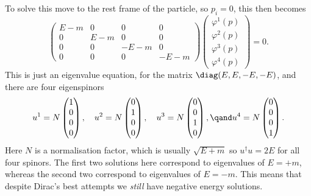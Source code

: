 \documentclass[fleqn]{NotesClass}
\newcommand{\hermit}{\dagger}
\begin{document}
    To solve this move to the rest frame of the particle, so \(p_i = 0\), this then becomes
    \begin{equation}
        \begin{pmatrix}
            E - m & 0 & 0 & 0\\
            0 & E - m & 0 & 0\\
            0 & 0 & -E - m & 0\\
            0 & 0 & 0 & -E - m
        \end{pmatrix}	
        \begin{pmatrix}
            \varphi^1(p)\\ \varphi^2(p)\\ \varphi^3(p)\\ \varphi^4(p)
        \end{pmatrix}
        = 0.
    \end{equation}
    This is just an eigenvalue equation, for the matrix \(\diag(E, E, -E, -E)\), and there are four eigenspinors
    \begin{equation}
        u^1 = N
        \begin{pmatrix}
            1\\ 0\\ 0\\ 0
        \end{pmatrix}
        , \quad u^2 = N
        \begin{pmatrix}
            0\\ 1\\ 0\\ 0
        \end{pmatrix}
        , \quad u^3 = N
        \begin{pmatrix}
            0\\ 0\\ 1\\ 0
        \end{pmatrix}
        , \qand u^4 = N
        \begin{pmatrix}
            0\\ 0\\ 0\\ 1
        \end{pmatrix}
        .
    \end{equation}
    Here \(N\) is a normalisation factor, which is usually \(\sqrt{E + m}\) so \(u^\hermit u = 2E\) for all four spinors.
    The first two solutions here correspond to eigenvalues of \(E = +m\), whereas the second two correspond to eigenvalues of \(E = -m\).
    This means that despite Dirac's best attempts we \emph{still} have negative energy solutions.
\end{document}
